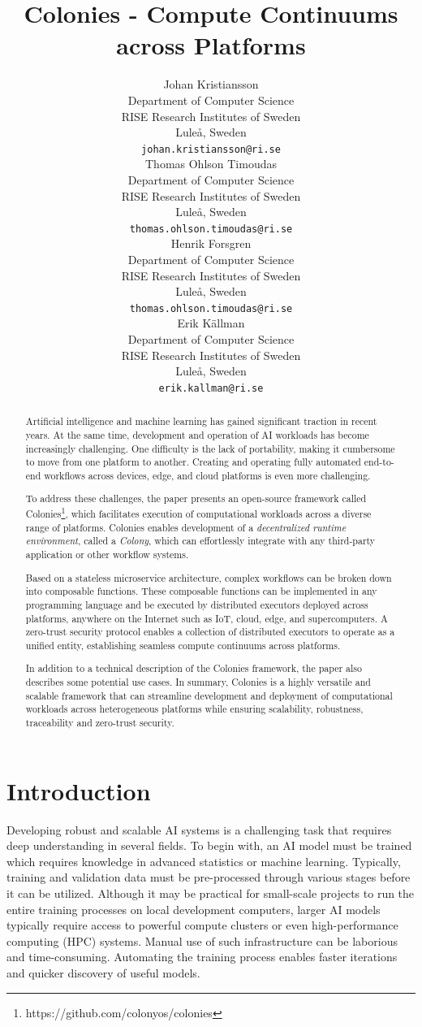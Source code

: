 \documentclass{article}
\title{Colonies - Compute Continuums across Platforms}
\author{{\hspace{1mm}Johan Kristiansson} \\
	Department of Computer Science \\
	RISE Research Institutes of Sweden \\
	Luleå, Sweden \\
	\texttt{johan.kristiansson@ri.se} \\
	\And
	{\hspace{1mm}Thomas Ohlson Timoudas} \\
	Department of Computer Science \\
	RISE Research Institutes of Sweden \\
	Luleå, Sweden \\
	\texttt{thomas.ohlson.timoudas@ri.se} \\
	\And
	{\hspace{1mm}Henrik Forsgren} \\
	Department of Computer Science \\
	RISE Research Institutes of Sweden \\
	Luleå, Sweden \\
	\texttt{thomas.ohlson.timoudas@ri.se} \\
	\And
	{\hspace{1mm}Erik Källman} \\
	Department of Computer Science \\
	RISE Research Institutes of Sweden \\
	Luleå, Sweden \\
	\texttt{erik.kallman@ri.se} \\
}
\begin{document}
\maketitle

\begin{abstract}
Artificial intelligence and machine learning has gained significant traction in recent years. At the same time, development and operation of AI workloads has become increasingly challenging. One difficulty is the lack of portability, making it cumbersome to move from one platform to another. Creating and operating fully automated end-to-end workflows across devices, edge, and cloud platforms is even more challenging. 

To address these challenges, the paper presents an open-source framework called Colonies\footnote{https://github.com/colonyos/colonies}, which facilitates execution of computational workloads across a diverse range of platforms. Colonies enables development of a \emph{decentralized runtime environment}, called a \emph{Colony}, which can effortlessly integrate with any third-party application or other workflow systems.

Based on a stateless microservice architecture, complex workflows can be broken down into composable functions. These composable functions can be implemented in any programming language and be executed by distributed executors deployed across platforms, anywhere on the Internet such as IoT, cloud, edge, and supercomputers. A zero-trust security protocol enables a collection of distributed executors to operate as a unified entity, establishing seamless compute continuums across platforms.

In addition to a technical description of the Colonies framework, the paper also describes some potential use cases. In summary, Colonies is a highly versatile and scalable framework that can streamline development and deployment of computational workloads across heterogeneous platforms while ensuring scalability, robustness, traceability and zero-trust security.
\end{abstract}


\section{Introduction}
Developing robust and scalable AI systems is a challenging task that requires deep understanding in several fields. To begin with, an AI model must be trained which requires knowledge in advanced statistics or machine learning. Typically, training and validation data must be pre-processed through various stages before it can be utilized. Although it may be practical for small-scale projects to run the entire training processes on local development computers, larger AI models typically require access to powerful compute clusters or even high-performance computing (HPC) systems. Manual use of such infrastructure can be laborious and time-consuming. Automating the training process enables faster iterations and quicker discovery of useful models.
\end{document}

